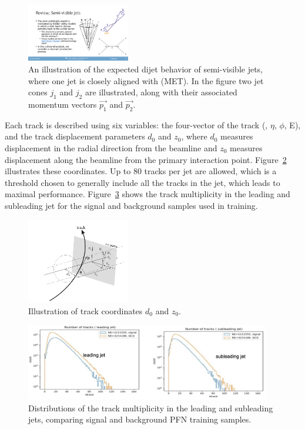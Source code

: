 \begin{figure}[!htbp]
\centering
   \includegraphics[width=0.4\textwidth]{figures/ml/dijet_topology}
    \caption{An illustration of the expected dijet behavior of semi-visible jets, where one jet is closely aligned with \met (MET). In the figure two jet cones $j_1$ and $j_2$ are illustrated, along with their associated momentum vectors $\vec{p_1}$ and $\vec{p_2}$. 
        \label{fig:svj_pic}}
\end{figure}

Each track is described using six variables: the four-vector of the track (\pt, $\eta$, $\phi$, E), and the track displacement parameters $d_0$ and $z_0$, where $d_0$ measures displacement in the radial direction from the beamline and $z_0$ measures displacement along the beamline from the primary interaction point. Figure~\ref{fig:trackcoordinates} illustrates these coordinates. Up to 80 tracks per jet are allowed, which is a threshold chosen to generally include all the tracks in the jet, which leads to maximal performance. Figure~\ref{fig:ntracks} shows the track multiplicity in the leading and subleading jet for the signal and background samples used in training. \par

\begin{figure}[!htbp]
\centering
   \includegraphics[width=0.4\textwidth]{figures/ml/trackcoordinates}
    \caption{Illustration of track coordinates $d_0$ and $z_0$.
    \label{fig:trackcoordinates}}
\end{figure}

\begin{figure}[!htbp]
\centering
   \includegraphics[width=0.95\textwidth]{figures/ml/ntracks}
    \caption{Distributions of the track multiplicity in the leading and subleading jets, comparing signal and background PFN training samples.
    \label{fig:ntracks}}
\end{figure}

